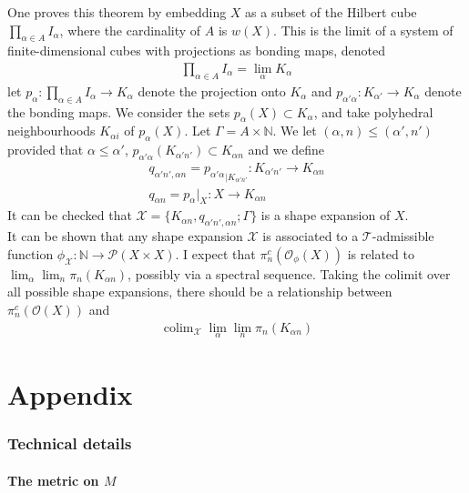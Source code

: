 \documentclass[a4paper,11pt]{article}
\theoremstyle{definition}
\theoremstyle{plain}
\theoremstyle{remark}
\DeclareMathOperator{\colim}{colim}
\begin{document}
{One proves this theorem by embedding $X$ as a subset of the Hilbert cube $\prod_{\alpha\in A} I_{\alpha}$, where the cardinality of $A$ is $w(X)$. This is the limit of a system of finite-dimensional cubes with projections as bonding maps, denoted 
\begin{align*}
\prod_{\alpha\in A} I_{\alpha} = \lim_{\alpha} K_{\alpha}
\end{align*}
let $p_{\alpha}: \prod_{\alpha\in A} I_{\alpha} \rightarrow K_{\alpha}$ denote the projection onto $K_{\alpha}$ and $p_{\alpha' \alpha}: K_{\alpha'}\rightarrow K_{\alpha}$ denote the bonding maps. We consider the sets $p_{\alpha}(X) \subset K_{\alpha}$, and take polyhedral neighbourhoods $K_{\alpha i}$ of $p_{\alpha}(X)$. Let $\Gamma = A \times \mathbb{N}$. We let $(\alpha, n)\leq (\alpha', n')$ provided that $\alpha \leq \alpha '$, $p_{\alpha' \alpha}(K_{\alpha' n'}) \subset K_{\alpha n}$ and we define
\begin{align*}
q_{\alpha' n', \alpha n} = {p_{\alpha' \alpha}}_{|K_{\alpha' n'}}: K_{\alpha' n'}\rightarrow K_{\alpha n}\\
q_{\alpha n} = p_{\alpha}|_{X}: X \rightarrow K_{\alpha n}
\end{align*}
It can be checked that $\mathcal{X} =\{K_{\alpha n}, q_{\alpha' n', \alpha n}; \Gamma\}$ is a shape expansion of $X$. \\

It can be shown that any shape expansion $\mathcal{X}$ is associated to a $\mathcal{T}$-admissible function $\phi_{\mathcal{X}}: \mathbb{N}\rightarrow \mathcal{P}(X\times X)$. I expect that $\pi_{n}^{c}(\mathcal{O}_{\phi}(X))$ is related to $\lim_{\alpha} \lim_{n} \pi_{n}(K_{\alpha n})$, possibly via a spectral sequence. Taking the colimit over all possible shape expansions, there should be a relationship between $\pi_{n}^{c}(\mathcal{O}(X))$ and 
\begin{align*}
\colim_{\mathcal{X}} \lim_{\alpha} \lim_{n} \pi_{n}(K_{\alpha n})
\end{align*}

\newpage 
\part{Appendix}
\section{Technical details}\subsection{The metric on $M$}

}
\end{document}
